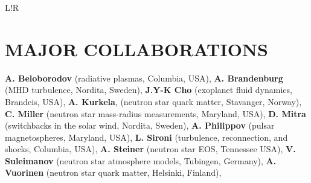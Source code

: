 \documentclass[letterpaper, onecolumn, 11pt]{article}
\newcommand\VRule{\color{lightgray}\vrule width 0.5pt}
\begin{document}
\begin{tabular}{L!{\VRule}R}
\end{tabular}


\vspace{-0.3cm}
\section*{MAJOR COLLABORATIONS}
\vspace{-0.3cm}
\textbf{A. Beloborodov} (radiative plasmas, Columbia, USA), 
\textbf{A. Brandenburg} (MHD turbulence, Nordita, Sweden), 
\textbf{J.Y-K Cho} (exoplanet fluid dynamics, Brandeis, USA), 
\textbf{A. Kurkela}, (neutron star quark matter, Stavanger, Norway),  
\textbf{C. Miller} (neutron star mass-radius measurements, Maryland, USA), 
\textbf{D. Mitra} (switchbacks in the solar wind, Nordita, Sweden), 
\textbf{A. Philippov} (pulsar magnetospheres, Maryland, USA),  
\textbf{L. Sironi} (turbulence, reconnection, and shocks, Columbia, USA),  
\textbf{A. Steiner} (neutron star EOS, Tennessee USA), 
\textbf{V. Suleimanov} (neutron star atmosphere models, Tubingen, Germany), 
\textbf{A. Vuorinen} (neutron star quark matter, Helsinki, Finland), 


\clearpage

\setcounter{page}{1}
\renewcommand\refname{\phantom{bla}}

\end{document}
